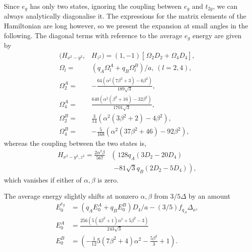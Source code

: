 \documentclass[a4paper,prb,twocolumn]{revtex4-1}  %
\newcommand{\com}[1]{}
\begin{document}
Since $e_{g}$ has only two states,
ignoring the coupling between $e_{g}$ and $t_{2g}$,
we can always analytically diagonalise it.
The expressions for the
matrix elements of the Hamiltonian are long however,
so we present the expansion at small angles in the following.
The diagonal terms with reference to the average $e_g$ energy are given by
\begin{align}
\label{eq:eg-hiix}
(H_{x^2-y^2},&H_{z^2}) = (1,-1)
\left[\frac{}{} \Omega_{2}  D_2 + \Omega_4 D_4\right],\\
\Omega_{l} =&  \left(q_A \Omega_{l}^A + q_B\Omega_{l}^B\right)/a,~(l=2,4),\\
\Omega_{2}^A =&  -\frac{64 \left(\alpha ^2 \left(7 \beta ^2+3\right)-6 \beta ^2\right)}{189 \sqrt{3}},\\
\Omega_{4}^A =& \frac{640 \left(\alpha ^2 \left(\beta ^2+16\right)-32 \beta ^2\right)}{1701 \sqrt{3}},\\
\Omega_{2}^B =&  \frac{3}{14} \left(\alpha ^2 \left(3 \beta ^2+2\right)-4 \beta ^2\right),\\
\Omega_{4}^B =& -\frac{5}{168}\left(\alpha ^2 \left(37 \beta ^2+46\right)-92 \beta ^2\right),
\end{align}
whereas the coupling between the two states is,
\begin{align}
\nonumber
H_{x^2-y^2,z^2}=
\frac{2\alpha ^2 \beta}{567} 
&\left(\frac{}{}128 q_A (3 D_2-20 D_4) \right. \\ \label{eq:eg-hijx}
&~~\left. - 81 \sqrt{3} q_B (2 D_2 -5 D_4)\right),
\end{align}
which vanishes if 
either of $\alpha,\beta$ is zero.


The average energy slightly shifts at nonzero $\alpha,\beta$
from $3/5\Delta$ by an amount
\begin{align}
\label{eq:eg-E0}
E_0^{e_{g}} &= \left(q_A E_0^A +q_B E_0^B\right)D_4/a - (3/5)f_{q_A}\Delta_o,\\
E_0^A &=
\frac{256 \left(5 \left(4 \beta ^2+1\right) \alpha ^2+5 \beta ^2-3\right)}{243 \sqrt{3}}\\
E_0^B &=
(-\frac{1}{12} 5 \left(7 \beta ^2+4\right) \alpha ^2-\frac{5 \beta ^2}{3}+1).
\end{align}


\com{
\begin{align}
H_{x^2-y^2,z^2}&=
\left[\frac{}{} \Lambda_{2}  D_2 + \Lambda_4 D_4\right],\\
\Lambda_{l} =&  \left(q_A \Lambda_{l}^A + q_B\Lambda_{l}^B\right)/a,~(l=2,4),\\
\Lambda_{2}^A =&
\frac{256 \alpha ^2 \beta }{189},\\
\Lambda_{4}^A =&
-\frac{1}{567} \left(5120 \alpha ^2 \beta \right),\\
\Lambda_{2}^B =&\frac{1}{7} (-4) \sqrt{3} \alpha ^2 \beta ,\\
\Lambda_{4}^B =&\frac{10}{7} \sqrt{3} \alpha ^2 \beta
\end{align}
}
\end{document}
